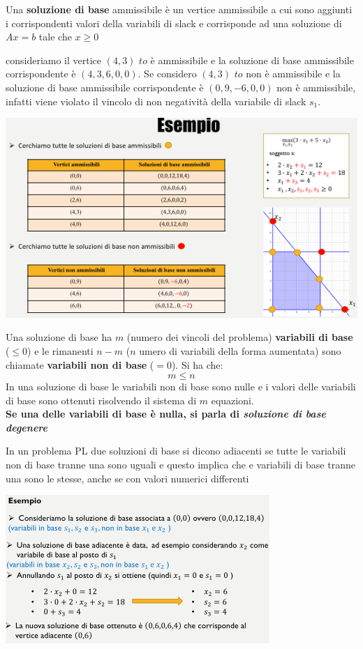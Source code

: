 \documentclass[a4paper,12pt, oneside]{book}
\begin{document}
\begin{definizione}
  Una \textbf{soluzione di base} ammissibile è un vertice ammissibile a
  cui sono aggiunti i corrispondenti valori della variabili di slack e
  corrisponde ad una soluzione di $Ax=b$ tale che $x\geq 0$
\end{definizione}
\begin{esempio}
  consideriamo il vertice $(4,3)$ $to$ è ammissibile e la soluzione di base
  ammissibile corrispondente è $(4, 3, 6, 0, 0)$. Se considero $(4,3)$
  $to$ non è ammissibile e la soluzione di base ammissibile corrispondente
  è $(0,9,-6,0,0)$ non è ammissibile, infatti viene violato il vincolo
  di non negatività della variabile di slack $s_1$.\\
  \begin{center}
    \includegraphics[scale = 1]{img/simp21.png}
  \end{center}
\end{esempio}
Una soluzione di base ha $m$ (numero dei vincoli del problema)
\textbf{variabili di base} ($\leq 0$) e le rimanenti $n − m$ ($n$ umero di
variabili della forma aumentata) sono chiamate \textbf{variabili
  non di base} ($=0$). Si ha che:
\[m\leq n\]
In una soluzione di base le variabili non di base sono nulle e i valori delle
variabili di base sono ottenuti risolvendo il sistema di $m$
equazioni.\\
\textbf{Se una delle variabili di base è nulla, si parla di 
  \textit{ soluzione di base degenere}}
\begin{definizione}
  In un problema PL due soluzioni di base si dicono adiacenti se tutte
  le variabili non di base tranne una sono uguali e questo implica che
  e variabili di base tranne una sono le stesse, anche se con 
  valori numerici differenti
\end{definizione}
\begin{center}
  \includegraphics[scale = 1]{img/simp22.png}
\end{center}
\end{document}
